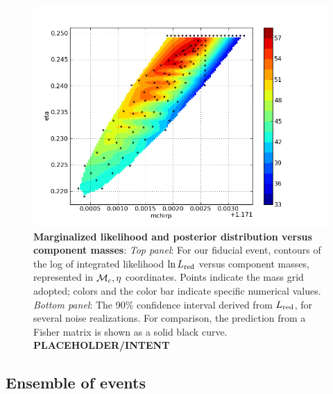 \documentclass[twocolumn,prd,nofootinbib]{revtex4}
\newcommand\mc{{{\cal M}_c}}
\begin{document}
\begin{figure}
\includegraphics[width=\columnwidth]{../Figures/coinc_id_12635_mchirp_eta_logevidence}
\caption{\textbf{Marginalized likelihood and posterior distribution versus component masses}: \emph{Top panel}: For our fiducial event,
  contours of the log of integrated likelihood $\ln L_{\rm red}$ versus component masses, represented in $\mc,\eta$
  coordinates.  Points indicate the mass grid adopted; colors and the color bar indicate specific numerical values.   
\emph{Bottom panel}: The 90\% confidence interval derived from $L_{\rm red}$, for several noise realizations.  For
comparison, the prediction from a Fisher matrix is shown as a solid black curve.
 \textbf{PLACEHOLDER/INTENT}
}
\end{figure}


\subsection{Ensemble of events}
\end{document}
